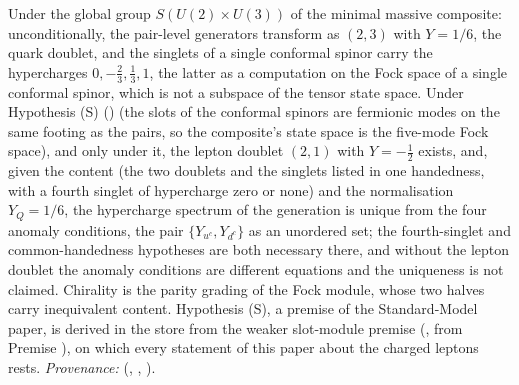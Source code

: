 Under the global group $S(U(2) \times U(3))$ of the minimal massive composite: unconditionally, the pair-level generators transform as $(2,3)$ with $Y = 1/6$, the quark doublet, and the singlets of a single conformal spinor carry the hypercharges $0, -\tfrac23, \tfrac13, 1$, the latter as a computation on the Fock space of a single conformal spinor, which is not a subspace of the tensor state space. Under Hypothesis (S) () (the slots of the conformal spinors are fermionic modes on the same footing as the pairs, so the composite's state space is the five-mode Fock space), and only under it, the lepton doublet $(2,1)$ with $Y = -\tfrac12$ exists, and, given the content (the two doublets and the singlets listed in one handedness, with a fourth singlet of hypercharge zero or none) and the normalisation $Y_{Q} = 1/6$, the hypercharge spectrum of the generation is unique from the four anomaly conditions, the pair $\{Y_{u^{c}}, Y_{d^{c}}\}$ as an unordered set; the fourth-singlet and common-handedness hypotheses are both necessary there, and without the lepton doublet the anomaly conditions are different equations and the uniqueness is not claimed. Chirality is the parity grading of the Fock module, whose two halves carry inequivalent content. Hypothesis (S), a premise of the Standard-Model paper, is derived in the store from the weaker slot-module premise (, from Premise ), on which every statement of this paper about the charged leptons rests. \emph{Provenance:} \cite[\S4-\S5, in particular Prop.~5.3, Thm.~5.5, Prop.~5.6]{ButlerT12} (, , ).
